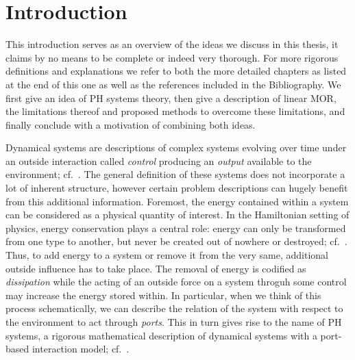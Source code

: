 \chapter{Introduction}

This introduction serves as an overview of the ideas we discuss in this thesis, it claims by no means to be complete or indeed very thorough.
For more rigorous definitions and explanations we refer to both the more detailed chapters as listed at the end of this one as well as the references included in the Bibliography.
We first give an idea of \ac{PH} systems theory, then give a description of linear \ac{MOR}, the limitations thereof and proposed methods to overcome these limitations, and finally conclude with a motivation of combining both ideas.

Dynamical systems are descriptions of complex systems evolving over time under an outside interaction called \emph{control} producing an \emph{output} available to the environment; cf.~\cite{Hinrichsen2005}.
The general definition of these systems does not incorporate a lot of inherent structure, however certain problem descriptions can hugely benefit from this additional information.
Foremost, the energy contained within a system can be considered as a physical quantity of interest.
In the Hamiltonian setting of physics, energy conservation plays a central role: energy can only be transformed from one type to another, but never be created out of nowhere or destroyed; cf.~\cite{Taylor2005, Giorgilli2022}.
Thus, to add energy to a system or remove it from the very same, additional outside influence has to take place.
The removal of energy is codified as \emph{dissipation} while the acting of an outside force on a system throguh some control may increase the energy stored within.
In particular, when we think of this process schematically, we can describe the relation of the system with respect to the environment to act through \emph{ports}.
This in turn gives rise to the name of \ac{PH} systems, a rigorous mathematical description of dynamical systems with a port-based interaction model; cf.~\cite{Duindam2009, Jacob2012, VanDerSchaft2014, Mehrmann2022}.

